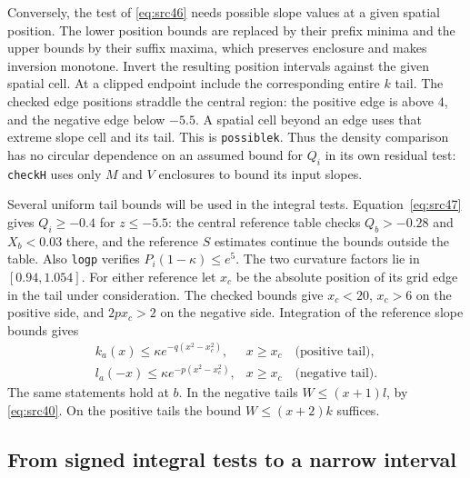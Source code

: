 \documentclass[11pt,a4paper]{article}
\numberwithin{equation}{section}
\theoremstyle{definition}
\theoremstyle{remark}
\begin{document}
Conversely, the test of \eqref{eq:src46} needs possible slope values
at a given spatial position.  The lower position bounds are replaced
by their prefix minima and the upper bounds by their suffix maxima,
which preserves enclosure and makes inversion monotone.  Invert the
resulting position intervals against the given spatial cell.  At a
clipped endpoint include the corresponding entire $k$ tail.  The
checked edge positions straddle the central region: the positive edge
is above $4$, and the negative edge below $-5.5$.  A spatial cell
beyond an edge uses that extreme slope cell and its tail.  This is
\texttt{possiblek}.  Thus the density comparison
has no circular dependence on an assumed bound for $Q_i$ in its own
residual test: \texttt{checkH} uses only $M$ and $V$ enclosures to
bound its input slopes.

Several uniform tail bounds will be used in the integral tests.
Equation~\eqref{eq:src47} gives $Q_i\ge-0.4$ for $z\le-5.5$:
the central reference table checks $Q_b>-0.28$ and $X_b<0.03$
there, and the reference $S$ estimates continue the bounds outside
the table.  Also \texttt{logp} verifies $P_i(1-\kappa)\le e^5$.
The two curvature factors lie in $[0.94,1.054]$.
For either reference let $x_c$ be the absolute position of its grid
edge in the tail under consideration.  The checked bounds give
$x_c<20$, $x_c>6$ on the positive side, and $2px_c>2$ on the
negative side.  Integration of the reference slope bounds gives
\[
 \begin{array}{ll}
 k_a(x)\le\kappa e^{-q(x^2-x_c^2)},&x\ge x_c\quad\text{(positive tail)},\\
 l_a(-x)\le\kappa e^{-p(x^2-x_c^2)},&x\ge x_c\quad\text{(negative tail)}.
 \end{array}
\]
The same statements hold at $b$.  In the negative tails
$W\le(x+1)l$, by \eqref{eq:src40}.  On the positive tails the bound
$W\le(x+2)k$ suffices.

\subsection{From signed integral tests to a narrow interval}
\end{document}
